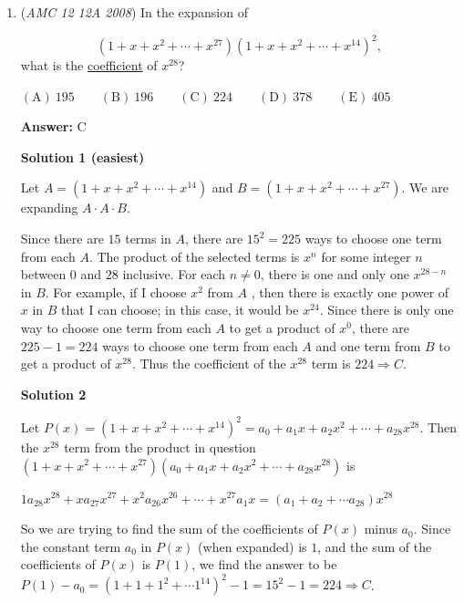 \begin{enumerate}
 


	\item (\textit{AMC 12 12A 2008}) In the expansion of

 \[\left(1 + x + x^2 + \cdots + x^{27}\right)\left(1 + x + x^2 + \cdots + x^{14}\right)^2,\]
what is the \href{https://artofproblemsolving.com/wiki/index.php?title=Coefficient}{coefficient} of $x^{28}$?


 $\mathrm{(A)}\ 195\qquad\mathrm{(B)}\ 196\qquad\mathrm{(C)}\ 224\qquad\mathrm{(D)}\ 378\qquad\mathrm{(E)}\ 405$

 \textbf{Answer: }C



\textbf{Solution 1 (easiest)}

Let $A = \left(1 + x + x^2 + \cdots + x^{14}\right)$ and $B = \left(1 + x + x^2 + \cdots + x^{27}\right)$. We are expanding $A \cdot A \cdot B$. 

 Since there are $15$ terms in $A$, there are $15^2 = 225$ ways to choose one term from each $A$. The product of the selected terms is $x^n$ for some integer $n$ between $0$ and $28$ inclusive. For each $n \neq 0$, there is one and only one $x^{28 - n}$ in $B$. For example, if I choose $x^2$ from $A$ , then there is exactly one power of $x$ in $B$ that I can choose; in this case, it would be $x^{24}$. Since there is only one way to choose one term from each $A$ to get a product of $x^0$, there are $225 - 1 = 224$ ways to choose one term from each $A$ and one term from $B$ to get a product of $x^{28}$. Thus the coefficient of the $x^{28}$ term is $224 \Rightarrow \boxed{C}$.

 



\textbf{Solution 2}

Let $P(x) = \left(1 + x + x^2 + \cdots + x^{14}\right)^2 = a_0 + a_1x + a_2x^2 + \cdots + a_{28}x^{28}$. Then the $x^{28}$ term from the product in question $\left(1 + x + x^2 + \cdots + x^{27}\right)(a_0 + a_1x + a_2x^2 + \cdots + a_{28}x^{28})$ is

 $1a_{28}x^{28} + xa_{27}x^{27} + x^2a_{26}x^{26} + \cdots + x^{27}a_1x = \left(a_1 + a_2 + \cdots a_{28}\right)x^{28}$

 So we are trying to find the sum of the coefficients of $P(x)$ minus $a_0$. Since the constant term $a_0$ in $P(x)$ (when expanded) is $1$, and the sum of the coefficients of $P(x)$ is $P(1)$, we find the answer to be$P(1) - a_0 = \left(1 + 1 + 1^2 + \cdots 1^{14}\right)^2 - 1 = 15^2 - 1 = 224 \Rightarrow \boxed{C}$.


\end{enumerate}
